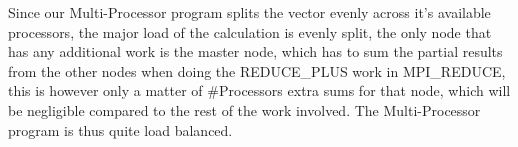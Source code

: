 Since our Multi-Processor program splits the vector evenly across it's available processors,
the major load of the calculation is evenly split, the only node that has any additional work is the master node, which has to sum the partial results from the other nodes when doing the REDUCE\_PLUS work in MPI\_REDUCE, this is however only a matter of #Processors extra sums for that node, which will be negligible compared to the rest of the work involved. The Multi-Processor program is thus quite load balanced.
